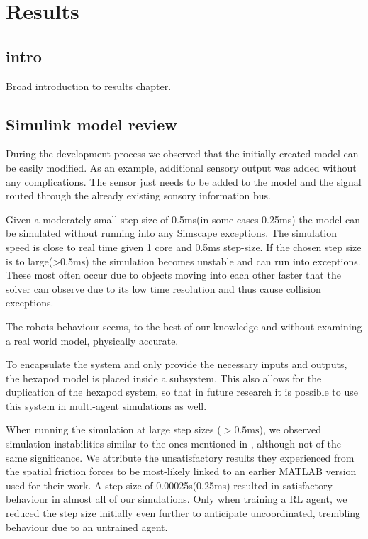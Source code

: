 \chapter{Results}
\label{ch:results}

\section{intro}
Broad introduction to results chapter.




\section{Simulink model review}
During the development process we observed that the initially created model can be easily modified.
As an example, additional sensory output was added without any complications.
The sensor just needs to be added to the model and the signal routed through the already existing sonsory information bus.

Given a moderately small step size of 0.5ms(in some cases 0.25ms) the model can be simulated without running into any Simscape exceptions.
The simulation speed is close to real time given 1 core and 0.5ms step-size.
If the chosen step size is to large(>0.5ms) the simulation becomes unstable and can run into exceptions.
These most often occur due to objects moving into each other faster that the solver can observe due to its low time resolution and thus cause collision exceptions.

The robots behaviour seems, to the best of our knowledge and without examining a real world model, physically accurate.

To encapsulate the system and only provide the necessary inputs and outputs, the hexapod model is placed inside a subsystem.
This also allows for the duplication of the hexapod system, so that in future research it is possible to use this system in multi-agent simulations as well.

When running the simulation at large step sizes ($>0.5 \text{ms}$), we observed simulation instabilities similar to the ones mentioned in \parencite{thilderkvist2015motion}, although not of the same significance.
We attribute the unsatisfactory results they experienced from the spatial friction forces to be most-likely linked to an earlier MATLAB version used for their work.
A step size of 0.00025s(0.25ms) resulted in satisfactory behaviour in almost all of our simulations.
Only when training a RL agent, we reduced the step size initially even further to anticipate uncoordinated, trembling behaviour due to an untrained agent.




